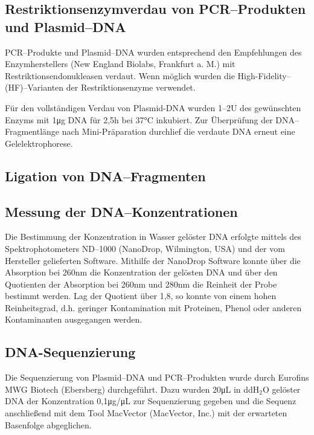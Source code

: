\subsection{Restriktionsenzymverdau von PCR--Produkten und Plasmid--DNA}
PCR--Produkte und Plasmid--DNA wurden entsprechend den Empfehlungen des Enzymherstellers (New England Biolabs, Frankfurt a. M.) mit Restriktionsendonukleasen verdaut. Wenn möglich wurden die High-Fidelity--(HF)--Varianten der Restriktionsenzyme verwendet. 

Für den vollständigen Verdau von Plasmid-DNA wurden 1--2\si{U} des gewünschten Enzyms mit 1\si{\micro\gram} DNA für 2,5\si{\hour} bei 37\si{\celsius} inkubiert. Zur Überprüfung der DNA--Fragmentlänge nach Mini-Präparation durchlief die verdaute DNA erneut eine Gelelektrophorese. 

\subsection{Ligation von DNA--Fragmenten}

\subsection{Messung der DNA--Konzentrationen}
Die Bestimmung der Konzentration in Wasser gelöster DNA erfolgte mittels des Spektrophotometers ND--1000 (NanoDrop, Wilmington, USA) und der vom Hersteller gelieferten Software. Mithilfe der NanoDrop Software konnte über die Absorption bei 260\si{\nano\meter} die Konzentration der gelösten DNA und über den Quotienten der Absorption bei 260\si{\nano\meter} und 280\si{\nano\meter} die Reinheit der Probe bestimmt werden. Lag der Quotient über 1,8, so konnte von einem hohen Reinheitsgrad, d.h. geringer Kontamination mit Proteinen, Phenol oder anderen Kontaminanten ausgegangen werden.

\subsection{DNA-Sequenzierung}
Die Sequenzierung von Plasmid--DNA und PCR--Produkten wurde durch Eurofins MWG Biotech (Ebersberg) durchgeführt. Dazu wurden 20\si{\micro\liter} in ddH$_2$O gelöster DNA der Konzentration 0,1\si{\micro\gram/\micro\liter} zur Sequenzierung gegeben und die Sequenz anschließend mit dem Tool MacVector (MacVector, Inc.) mit der erwarteten Basenfolge abgeglichen.

\